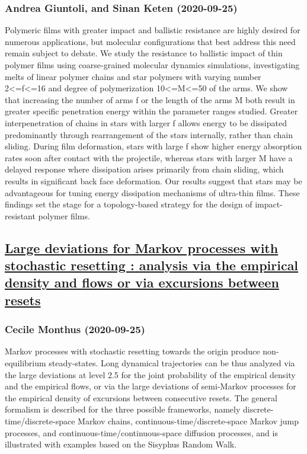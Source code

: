 \subsubsection*{Andrea Giuntoli, and Sinan Keten (2020-09-25)}
Polymeric films with greater impact and ballistic resistance are highly
desired for numerous applications, but molecular configurations that best
address this need remain subject to debate. We study the resistance to
ballistic impact of thin polymer films using coarse-grained molecular dynamics
simulations, investigating melts of linear polymer chains and star polymers
with varying number 2<=f<=16 and degree of polymerization 10<=M<=50 of the
arms. We show that increasing the number of arms f or the length of the arms M
both result in greater specific penetration energy within the parameter ranges
studied. Greater interpenetration of chains in stars with larger f allows
energy to be dissipated predominantly through rearrangement of the stars
internally, rather than chain sliding. During film deformation, stars with
large f show higher energy absorption rates soon after contact with the
projectile, whereas stars with larger M have a delayed response where
dissipation arises primarily from chain sliding, which results in significant
back face deformation. Our results suggest that stars may be advantageous for
tuning energy dissipation mechanisms of ultra-thin films. These findings set
the stage for a topology-based strategy for the design of impact-resistant
polymer films.

\subsection*{\href{http://arxiv.org/abs/2009.12287v1}{Large deviations for Markov processes with stochastic resetting :  analysis via the empirical density and flows or via excursions between resets}}
\subsubsection*{Cecile Monthus (2020-09-25)}
Markov processes with stochastic resetting towards the origin produce
non-equilibrium steady-states. Long dynamical trajectories can be thus analyzed
via the large deviations at level 2.5 for the joint probability of the
empirical density and the empirical flows, or via the large deviations of
semi-Markov processes for the empirical density of excursions between
consecutive resets. The general formalism is described for the three possible
frameworks, namely discrete-time/discrete-space Markov chains,
continuous-time/discrete-space Markov jump processes, and
continuous-time/continuous-space diffusion processes, and is illustrated with
examples based on the Sisyphus Random Walk.

